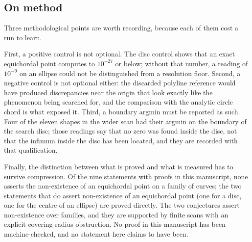 \documentclass[11pt]{article}
\theoremstyle{definition}
\theoremstyle{remark}
\begin{document}
\subsection{On method}

Three methodological points are worth recording, because each of them cost a run to learn.

First, a positive control is not optional. The disc control shows that an exact equichordal point computes to
$10^{-27}$ or below; without that number, a reading of $10^{-9}$ on an ellipse could not be distinguished from a
resolution floor. Second, a negative control is not optional either: the discarded polyline reference would have
produced discrepancies near the origin that look exactly like the phenomenon being searched for, and the
comparison with the analytic circle chord is what exposed it. Third, a boundary argmin must be reported as such.
Four of the eleven shapes in the wider scan had their argmin on the boundary of the search disc; those readings
say that no zero was found inside the disc, not that the infimum inside the disc has been located, and they are
recorded with that qualification.

Finally, the distinction between what is proved and what is measured has to survive compression. Of the nine
statements with proofs in this manuscript, none asserts the non-existence of an equichordal point on a family of
curves; the two statements that do assert non-existence of an equichordal point (one for a disc, one for the
centre of an ellipse) are proved directly. The two conjectures assert non-existence over families, and they are
supported by finite scans with an explicit covering-radius obstruction. No proof in this manuscript has been
machine-checked, and no statement here claims to have been.
\end{document}
